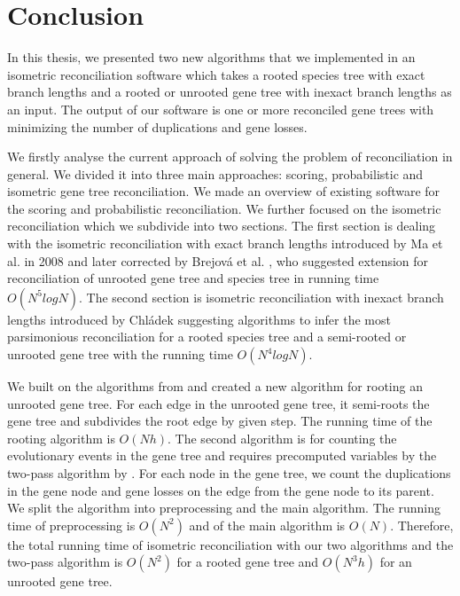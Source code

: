 \chapter*{Conclusion}

In this thesis, we presented two new algorithms that we implemented in an isometric reconciliation software which takes a rooted species tree with exact branch lengths and a rooted or unrooted gene tree with inexact branch lengths as an input. The output of our software is one or more reconciled gene trees with minimizing the number of duplications and gene losses.

We firstly analyse the current approach of solving the problem of reconciliation in general. We divided it into three main approaches: scoring, probabilistic and isometric gene tree reconciliation. We made an overview of existing software for the scoring and probabilistic reconciliation. We further focused on the isometric reconciliation which we subdivide into two sections. The first section is dealing with the isometric reconciliation with exact branch lengths introduced by Ma et al. \cite{ma} in 2008 and later corrected by Brejová et al. \cite{brejova}, who suggested extension for reconciliation of unrooted gene tree and species tree in running time $O(N^5 log N)$. The second section is isometric reconciliation with inexact branch lengths introduced by Chládek \cite{chladek_thesis} suggesting algorithms to infer the most parsimonious reconciliation for a rooted species tree and a semi-rooted or unrooted gene tree with the running time $O(N^4 log N)$.

We built on the algorithms from \cite{chladek_thesis} and created a new algorithm for rooting an unrooted gene tree. For each edge in the unrooted gene tree, it semi-roots the gene tree and subdivides the root edge by given step. The running time of the rooting algorithm is $O(Nh)$. The second algorithm is for counting the evolutionary events in the gene tree and requires precomputed variables by the two-pass algorithm by \cite{chladek_thesis}. For each node in the gene tree, we count the duplications in the gene node and gene losses on the edge from the gene node to its parent. We split the algorithm into preprocessing and the main algorithm. The running time of preprocessing is $O(N^2)$ and of the main algorithm is $O(N)$. Therefore, the total running time of isometric reconciliation with our two algorithms and the two-pass algorithm \cite{chladek} is $O(N^2)$ for a rooted gene tree and $O(N^3h)$ for an unrooted gene tree.


